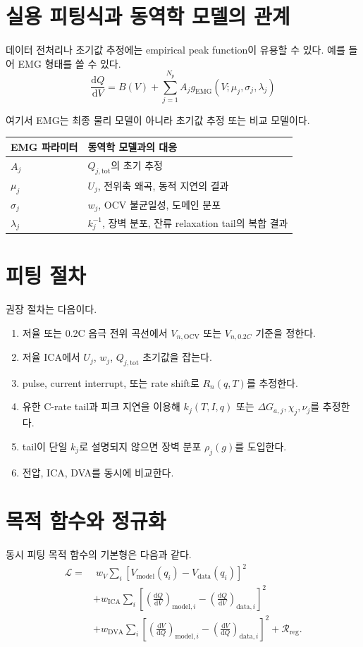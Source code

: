 \documentclass[11pt,a4paper]{article}
\newcommand{\dd}{\mathrm{d}}
\newcommand{\OCV}{\mathrm{OCV}}
\newcommand{\tot}{\mathrm{tot}}
\begin{document}
\section{실용 피팅식과 동역학 모델의 관계}
데이터 전처리나 초기값 추정에는 empirical peak function이 유용할 수 있다. 예를 들어 EMG 형태를 쓸 수 있다.
\begin{equation}
\frac{\dd Q}{\dd V}=B(V)+\sum_{j=1}^{N_p}A_jg_{\mathrm{EMG}}(V;\mu_j,\sigma_j,\lambda_j)
\label{eq:EMG_empirical}
\end{equation}

여기서 EMG는 최종 물리 모델이 아니라 초기값 추정 또는 비교 모델이다.

\begin{longtable}{p{}p{}}
\toprule
EMG 파라미터 & 동역학 모델과의 대응 \\
\midrule
\endhead
\(A_j\) & \(Q_{j,\tot}\)의 초기 추정 \\
\(\mu_j\) & \(U_j\), 전위축 왜곡, 동적 지연의 결과 \\
\(\sigma_j\) & \(w_j\), OCV 불균일성, 도메인 분포 \\
\(\lambda_j\) & \(k_j^{-1}\), 장벽 분포, 잔류 relaxation tail의 복합 결과 \\
\bottomrule
\end{longtable}

\section{피팅 절차}
권장 절차는 다음이다.

\begin{enumerate}[label=\arabic*)]
\item 저율 또는 0.2C 음극 전위 곡선에서 \(V_{n,\OCV}\) 또는 \(V_{n,0.2C}\) 기준을 정한다.
\item 저율 ICA에서 \(U_j\), \(w_j\), \(Q_{j,\tot}\) 초기값을 잡는다.
\item pulse, current interrupt, 또는 rate shift로 \(R_n(q,T)\)를 추정한다.
\item 유한 C-rate tail과 피크 지연을 이용해 \(k_j(T,I,q)\) 또는 \(\Delta G_{a,j},\chi_j,\nu_j\)를 추정한다.
\item tail이 단일 \(k_j\)로 설명되지 않으면 장벽 분포 \(\rho_j(g)\)를 도입한다.
\item 전압, ICA, DVA를 동시에 비교한다.
\end{enumerate}

\section{목적 함수와 정규화}
동시 피팅 목적 함수의 기본형은 다음과 같다.
\begin{align}
\mathcal L
=&\;w_V\sum_i\left[V_{\mathrm{model}}(q_i)-V_{\mathrm{data}}(q_i)\right]^2 \\
&+w_{\mathrm{ICA}}\sum_i\left[\left(\frac{\dd Q}{\dd V}\right)_{\mathrm{model},i}-\left(\frac{\dd Q}{\dd V}\right)_{\mathrm{data},i}\right]^2 \\
&+w_{\mathrm{DVA}}\sum_i\left[\left(\frac{\dd V}{\dd Q}\right)_{\mathrm{model},i}-\left(\frac{\dd V}{\dd Q}\right)_{\mathrm{data},i}\right]^2
+\mathcal R_{\mathrm{reg}}.
\end{align}
\end{document}
